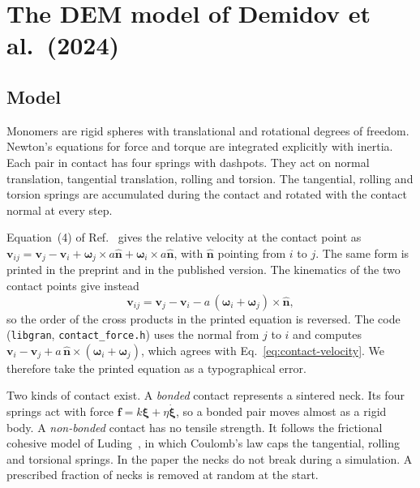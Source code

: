 \documentclass[11pt,a4paper]{article}
\begin{document}
\section{The DEM model of Demidov et al.\ (2024)}
\label{sec:demidov}

\subsection{Model}
\label{sec:model}

Monomers are rigid spheres with translational and rotational degrees of freedom.
Newton's equations for force and torque are integrated explicitly with inertia.
Each pair in contact has four springs with dashpots.
They act on normal translation, tangential translation, rolling and torsion.
The tangential, rolling and torsion springs are accumulated during the contact and rotated with the contact normal at every step.

Equation~(4) of Ref.~\cite{demidov2024} gives the relative velocity at the contact point as $\bm{v}_{ij} = \bm{v}_j - \bm{v}_i + \bm{\omega}_j \times a\hat{\bm{n}} + \bm{\omega}_i \times a\hat{\bm{n}}$, with $\hat{\bm{n}}$ pointing from $i$ to $j$.
The same form is printed in the preprint and in the published version.
The kinematics of the two contact points give instead
\begin{equation}
  \bm{v}_{ij} = \bm{v}_j - \bm{v}_i - a\,(\bm{\omega}_i + \bm{\omega}_j) \times \hat{\bm{n}} ,
  \label{eq:contact-velocity}
\end{equation}
so the order of the cross products in the printed equation is reversed.
The code (\texttt{libgran}, \texttt{contact\_force.h}) uses the normal from $j$ to $i$ and computes $\bm{v}_i - \bm{v}_j + a\,\hat{\bm{n}} \times (\bm{\omega}_i + \bm{\omega}_j)$, which agrees with Eq.~\eqref{eq:contact-velocity}.
We therefore take the printed equation as a typographical error.

Two kinds of contact exist.
A \emph{bonded} contact represents a sintered neck.
Its four springs act with force $\bm{f} = k\bm{\xi} + \eta\dot{\bm{\xi}}$, so a bonded pair moves almost as a rigid body.
A \emph{non-bonded} contact has no tensile strength.
It follows the frictional cohesive model of Luding~\cite{luding2008}, in which Coulomb's law caps the tangential, rolling and torsional springs.
In the paper the necks do not break during a simulation.
A prescribed fraction of necks is removed at random at the start.
\end{document}
